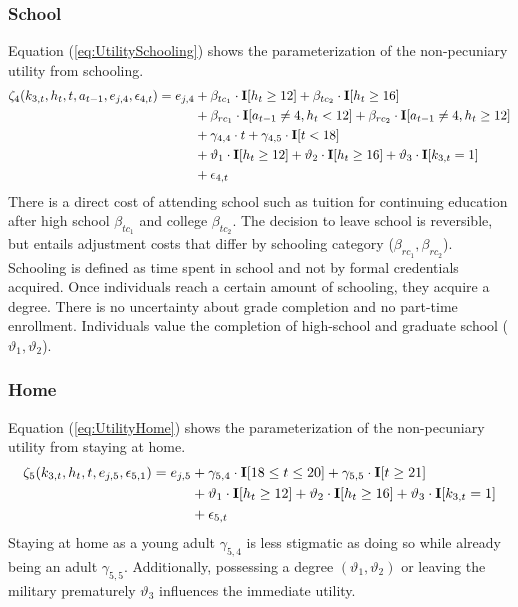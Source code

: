 \subsubsection*{School}
Equation (\ref{eq:UtilitySchooling}) shows the parameterization of the non-pecuniary utility from schooling.
%
\begin{align}\label{eq:UtilitySchooling}
	\zeta_4(k_{3,t}, h_t, t, a_{t-1}, e_{j,4}, \epsilon_{4,t})  = e_{j,4} & + \beta_{tc_1} \cdot {\textbf{I}}[h_t \geq 12] + \beta_{tc_2} \cdot {\textbf{I}}[h_t \geq 16]   \\\nonumber
    							  & + \beta_{rc_1} \cdot {\textbf{I}}[a_{t-1} \neq 4, h_t < 12] + \beta_{rc_2} \cdot {\textbf{I}}[a_{t-1} \neq 4, h_t \geq 12] \\\nonumber
    							  & + \gamma_{4,4} \cdot t + \gamma_{4,5} \cdot {\textbf{I}}[t < 18] 																					  \\\nonumber
     							  & + \vartheta_1 \cdot {\textbf{I}}[h_t \geq 12] + \vartheta_2 \cdot {\textbf{I}}[h_t \geq 16] + \vartheta_3 \cdot {\textbf{I}}[k_{3,t} = 1]\\\nonumber
      							& + \epsilon_{4,t}
\end{align}
%
There is a direct cost of attending school such as tuition for continuing education after high school $\beta_{tc_1}$ and college $\beta_{tc_2}$. The decision to leave school is reversible, but entails adjustment costs that differ by schooling category ($\beta_{rc_1}, \beta_{rc_2}$). Schooling is defined as time spent in school and not by formal credentials acquired. Once individuals reach a certain amount of schooling, they acquire a degree. There is no uncertainty about grade completion \citep{Altonji.1993} and no part-time enrollment. Individuals value the completion of high-school and graduate school ($\vartheta_1, \vartheta_2$).
\subsubsection*{Home}
Equation (\ref{eq:UtilityHome}) shows the parameterization of the non-pecuniary utility from staying at home.
%
\begin{align}\label{eq:UtilityHome}
	\zeta_5(k_{3,t}, h_t, t, e_{j,5}, \epsilon_{5,1}) =  e_{j,5} & + \gamma_{5,4} \cdot {\textbf{I}}[18 \leq t \leq 20] + \gamma_{5,5} \cdot {\textbf{I}}[t \geq 21] \\ \nonumber
    							   & +\vartheta_{1} \cdot {\textbf{I}}[h_t \geq 12] + \vartheta_{2} \cdot {\textbf{I}}[h_t \geq 16] +  \vartheta_3 \cdot {\textbf{I}}[k_{3,t} = 1]  \\ \nonumber
    							   & + \epsilon_{5,t}
\end{align}
%
Staying at home as a young adult $\gamma_{5, 4}$ is less stigmatic as doing so while already being an adult $\gamma_{5,5}$. Additionally, possessing a degree  $(\vartheta_1, \vartheta_2)$ or leaving the military prematurely $\vartheta_3$ influences the immediate utility.
